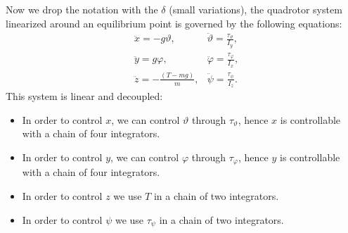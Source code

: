 \documentclass[10pt, a4paper]{report}
\begin{document}
Now we drop the notation with the $\delta$ (small variations), the quadrotor system linearized around an equilibrium point is governed by the following equations:\begin{align}
    &\ddot x=-g\vartheta,&\ddot\vartheta=\frac{\tau_\vartheta}{I_y},\\
    &\ddot y=g\varphi,&\ddot\varphi=\frac{\tau_\varphi}{I_x},\\
    &\ddot z=-\frac{(T-mg)}{m},&\ddot\psi=\frac{\tau_\psi}{I_z}.
\end{align} 
This system is linear and decoupled:\begin{itemize}
    \item In order to control $x$, we can control $\vartheta$ through $\tau_\vartheta$, hence $x$ is controllable with a chain of four integrators.
    \item In order to control $y$, we can control $\varphi$ through $\tau_\varphi$, hence $y$ is controllable with a chain of four integrators.
    \item In order to control $z$ we use $T$ in a chain of two integrators.
    \item In order to control $\psi$ we use $\tau_\psi$ in a chain of two integrators.
\end{itemize}
\end{document}
